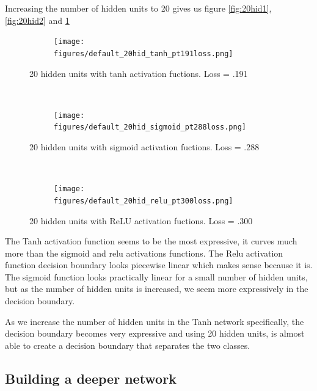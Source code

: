 \documentclass[]{article}
\begin{document}
Increasing the number of hidden units to 20 gives us figure \ref{fig:20hid1}, \ref{fig:20hid2} and  \ref{fig:20hid3}

\begin{figure}[ht]
    \centering
    \begin{subfigure}
        \centering
        \texttt{[image: figures/default\_20hid\_tanh\_pt191loss.png]}
    \end{subfigure}%
    \caption{20 hidden units with tanh activation fuctions. Loss = .191}
 \label{fig:20hid1}
    ~ 
    \begin{subfigure}
        \centering
        \texttt{[image: figures/default\_20hid\_sigmoid\_pt288loss.png]}
    \end{subfigure}
    \caption{20 hidden units with sigmoid activation fuctions. Loss = .288}
 \label{fig:20hid2}
    ~ 
    \begin{subfigure}
        \centering
        \texttt{[image: figures/default\_20hid\_relu\_pt300loss.png]}
    \end{subfigure}
    \caption{20 hidden units with ReLU activation fuctions. Loss = .300}
 \label{fig:20hid3}
\end{figure}

The Tanh activation function seems to be the most expressive, it curves much more than the sigmoid and relu activations functions. The Relu activation function decision boundary looks piecewise linear which makes sense because it is. The sigmoid function looks practically linear for a small number of hidden units, but as the number of hidden units is increased, we seem more expressively in the decision boundary. 

As we increase the number of hidden units in the Tanh network specifically, the decision boundary becomes very expressive and using 20 hidden units, is almost able to create a decision boundary that separates the two classes. 

\subsection{Building a deeper network}
\end{document}
